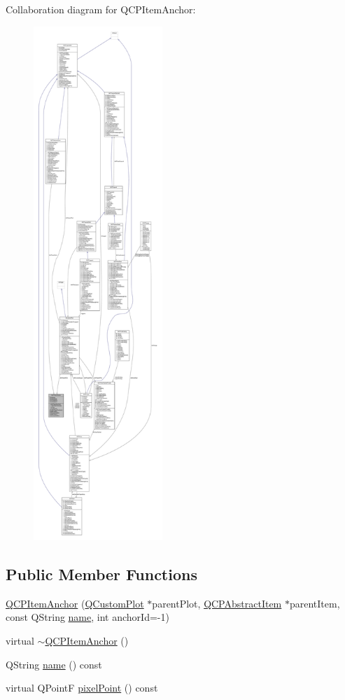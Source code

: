 Collaboration diagram for Q\+C\+P\+Item\+Anchor\+:\nopagebreak
\begin{figure}[H]
\begin{center}
\leavevmode
\includegraphics[height=550pt]{class_q_c_p_item_anchor__coll__graph}
\end{center}
\end{figure}
\subsection*{Public Member Functions}
\begin{DoxyCompactItemize}
\item 
\hyperlink{class_q_c_p_item_anchor_aeb6b681d2bf324db40a915d32ec5624f}{Q\+C\+P\+Item\+Anchor} (\hyperlink{class_q_custom_plot}{Q\+Custom\+Plot} $\ast$parent\+Plot, \hyperlink{class_q_c_p_abstract_item}{Q\+C\+P\+Abstract\+Item} $\ast$parent\+Item, const Q\+String \hyperlink{class_q_c_p_item_anchor_ac93984042a58c875e76847dc3e5f75fe}{name}, int anchor\+Id=-\/1)
\item 
virtual \hyperlink{class_q_c_p_item_anchor_a1868559407600688ee4d1a4621e81ceb}{$\sim$\+Q\+C\+P\+Item\+Anchor} ()
\item 
Q\+String \hyperlink{class_q_c_p_item_anchor_ac93984042a58c875e76847dc3e5f75fe}{name} () const 
\item 
virtual Q\+Point\+F \hyperlink{class_q_c_p_item_anchor_ae92def8f9297c5d73f5806c586517bb3}{pixel\+Point} () const 
\end{DoxyCompactItemize}
